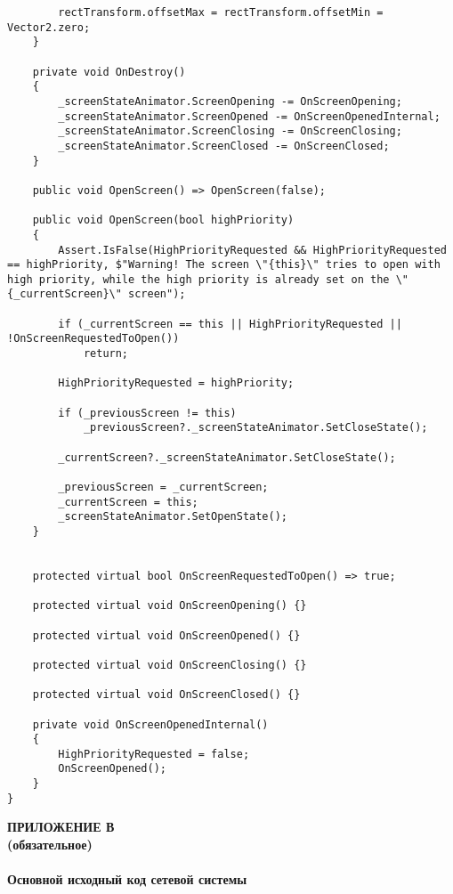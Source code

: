 \begin{lstlisting}
        rectTransform.offsetMax = rectTransform.offsetMin = Vector2.zero;
    }

    private void OnDestroy()
    {
        _screenStateAnimator.ScreenOpening -= OnScreenOpening;
        _screenStateAnimator.ScreenOpened -= OnScreenOpenedInternal;
        _screenStateAnimator.ScreenClosing -= OnScreenClosing;
        _screenStateAnimator.ScreenClosed -= OnScreenClosed;
    }

    public void OpenScreen() => OpenScreen(false);

    public void OpenScreen(bool highPriority)
    {
        Assert.IsFalse(HighPriorityRequested && HighPriorityRequested == highPriority, $"Warning! The screen \"{this}\" tries to open with high priority, while the high priority is already set on the \"{_currentScreen}\" screen");

        if (_currentScreen == this || HighPriorityRequested || !OnScreenRequestedToOpen())
            return;

        HighPriorityRequested = highPriority;

        if (_previousScreen != this)
            _previousScreen?._screenStateAnimator.SetCloseState();

        _currentScreen?._screenStateAnimator.SetCloseState();

        _previousScreen = _currentScreen;
        _currentScreen = this;
        _screenStateAnimator.SetOpenState();
    }


    protected virtual bool OnScreenRequestedToOpen() => true;

    protected virtual void OnScreenOpening() {}

    protected virtual void OnScreenOpened() {}

    protected virtual void OnScreenClosing() {}

    protected virtual void OnScreenClosed() {}

    private void OnScreenOpenedInternal()
    {
        HighPriorityRequested = false;
        OnScreenOpened();
    }
}
\end{lstlisting}


\newpage
{}
{}
\begin{center}
  \textbf{\MakeUppercase{Приложение В}\\
          (обязательное)\\~\\
          Основной исходный код сетевой системы}
\end{center}

